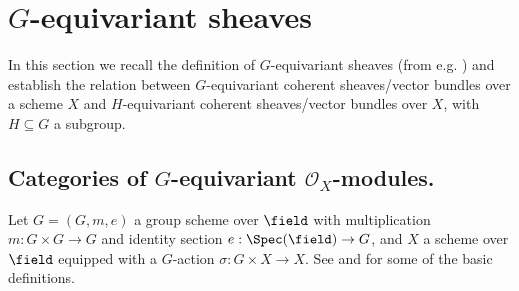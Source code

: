 \section{$G$-equivariant sheaves\label{sec:G-equiv-sheaves}}
In this section we recall the definition of $G$-equivariant sheaves (from e.g. \cite[\href{https://stacks.math.columbia.edu/tag/03LE}{Tag 03LE}]{stacks-project}) and establish the relation between $G$-equivariant coherent sheaves/vector bundles over a scheme $X$ and $H$-equivariant coherent sheaves/vector bundles over $X$, with $H\subseteq G$ a subgroup.

\subsection{Categories of $G$-equivariant $\mathcal{O}_X$-modules.}
Let $G=(G, m, e)$ a group scheme over $\field$ with multiplication $m : G \times G \rightarrow G$ and identity section $e : \Spec(\field) \rightarrow G$,
and
$X$ a scheme over $\field$
equipped with a $G$-action
$\sigma : G \times X \rightarrow X$. See \cite[\href{https://stacks.math.columbia.edu/tag/022R}{Section 022R}]{stacks-project} and \cite[\href{https://stacks.math.columbia.edu/tag/01II}{Section 01II}]{stacks-project} for some of the basic definitions.

